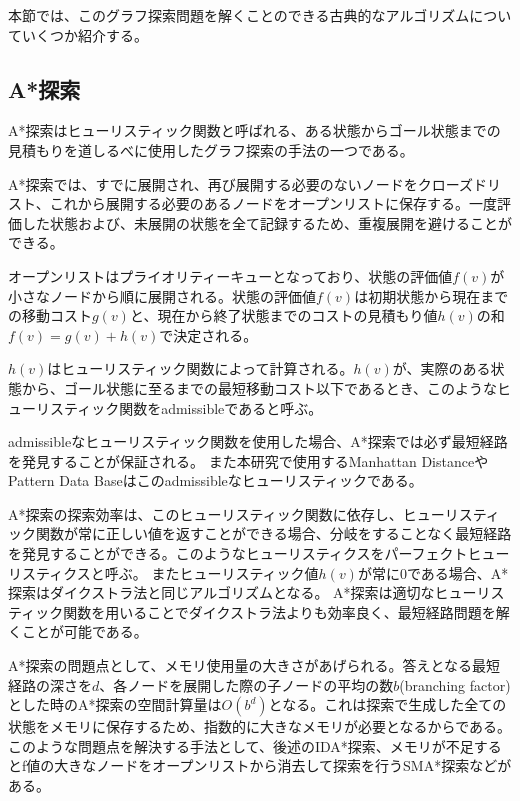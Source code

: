 \documentclass[a4paper,11pt,oneside,openany]{jsbook}
\begin{document}
本節では、このグラフ探索問題を解くことのできる古典的なアルゴリズムについていくつか紹介する。

\subsection{A*探索}
A*探索\cite{HNR68}はヒューリスティック関数と呼ばれる、ある状態からゴール状態までの見積もりを道しるべに使用したグラフ探索の手法の一つである。

A*探索では、すでに展開され、再び展開する必要のないノードをクローズドリスト、これから展開する必要のあるノードをオープンリストに保存する。一度評価した状態および、未展開の状態を全て記録するため、重複展開を避けることができる。

オープンリストはプライオリティーキューとなっており、状態の評価値$f(v)$が小さなノードから順に展開される。状態の評価値$f(v)$は初期状態から現在までの移動コスト$g(v)$と、現在から終了状態までのコストの見積もり値$h(v)$の和$f(v) = g(v) + h(v)$で決定される。

$h(v)$はヒューリスティック関数によって計算される。$h(v)$が、実際のある状態から、ゴール状態に至るまでの最短移動コスト以下であるとき、このようなヒューリスティック関数をadmissibleであると呼ぶ。

admissibleなヒューリスティック関数を使用した場合、A*探索では必ず最短経路を発見することが保証される。
また本研究で使用するManhattan DistanceやPattern Data Baseはこのadmissibleなヒューリスティックである。

A*探索の探索効率は、このヒューリスティック関数に依存し、ヒューリスティック関数が常に正しい値を返すことができる場合、分岐をすることなく最短経路を発見することができる。このようなヒューリスティクスをパーフェクトヒューリスティクスと呼ぶ。
またヒューリスティック値$h(v)$が常に0である場合、A*探索はダイクストラ法と同じアルゴリズムとなる。
A*探索は適切なヒューリスティック関数を用いることでダイクストラ法よりも効率良く、最短経路問題を解くことが可能である。

A*探索の問題点として、メモリ使用量の大きさがあげられる。答えとなる最短経路の深さを$d$、各ノードを展開した際の子ノードの平均の数$b$(branching factor)とした時のA*探索の空間計算量は$O(b^d)$となる。これは探索で生成した全ての状態をメモリに保存するため、指数的に大きなメモリが必要となるからである。
このような問題点を解決する手法として、後述のIDA*探索\cite{Kor85}、メモリが不足するとf値の大きなノードをオープンリストから消去して探索を行うSMA*探索\cite{Rus92}などがある。
\end{document}
